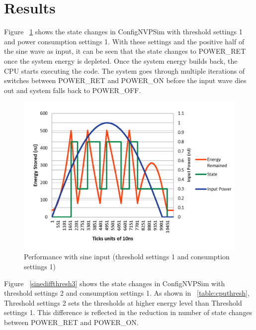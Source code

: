 \documentclass[conference]{IEEEtran}
\begin{document}
\section{\textbf{Results}}
Figure ~\ref{sine3} shows the state changes in ConfigNVPSim with threshold settings 1 and power consumption settings 1. With these settings and the positive half of the sine wave as input, it can be seen that the state changes to POWER\_RET once the system energy is depleted. Once the system energy builds back, the CPU starts executing the code. The system goes through multiple iterations of switches between POWER\_RET and POWER\_ON before the input wave dies out and system falls back to POWER\_OFF. 

\begin{figure}[htbp]
\centerline{\includegraphics[scale=0.3]{sine3.png}}
\caption{Performance with sine input (threshold settings 1 and consumption settings 1)}
\label{sine3}
\end{figure}

Figure ~\ref{sinediffthresh3} shows the state changes in ConfigNVPSim with threshold settings 2 and consumption settings 1. As shown in ~\ref{table:cputhresh}, Threshold settings 2 sets the thresholds at higher energy level than Threshold settings 1. This difference is reflected in the reduction in number of state changes between POWER\_RET and POWER\_ON.
\end{document}
